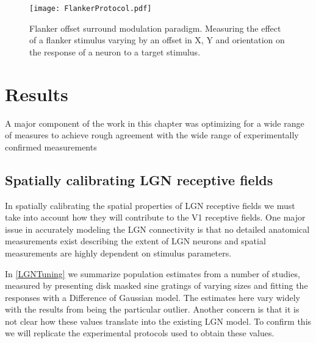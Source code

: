 \begin{figure}
	\centering
        \texttt{[image: FlankerProtocol.pdf]}
	\caption{Flanker offset surround modulation paradigm. Measuring
      the effect of a flanker stimulus varying by an offset in X, Y
      and orientation on the response of a neuron to a target
      stimulus.}
	\label{Flanker}
\end{figure}

\section{Results}

A major component of the work in this chapter was optimizing for a
wide range of measures to achieve rough agreement with the wide range
of experimentally confirmed measurements

\subsection{Spatially calibrating LGN receptive fields}

In spatially calibrating the spatial properties of LGN receptive
fields we must take into account how they will contribute to the V1
receptive fields. One major issue in accurately modeling the LGN
connectivity is that no detailed anatomical measurements exist
describing the extent of LGN neurons and spatial measurements are
highly dependent on stimulus parameters.

In \ref{LGNTuning} we summarize population estimates from a number of
studies, measured by presenting disk masked sine gratings of varying
sizes and fitting the responses with a Difference of Gaussian model.
The estimates here vary widely with the results from
\citep{Sceniak2006} being the particular outlier. Another concern is
that it is not clear how these values translate into the existing LGN
model. To confirm this we will replicate the experimental protocols
used to obtain these values.

